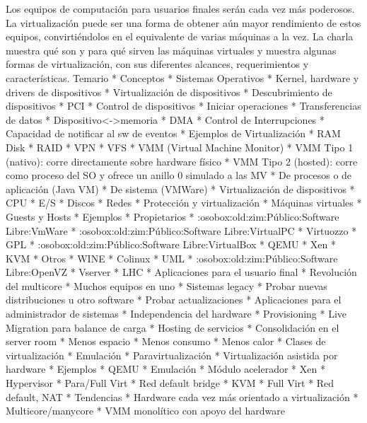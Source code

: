 Los equipos de computación para usuarios finales serán cada vez más
poderosos. La virtualización puede ser una forma de obtener aún mayor
rendimiento de estos equipos, convirtiéndolos en el equivalente de
varias máquinas a la vez. La charla muestra qué son y para qué sirven
las máquinas virtuales y muestra algunas formas de virtualización, con
sus diferentes alcances, requerimientos y características.
Temario
* Conceptos
	* Sistemas Operativos
		* Kernel, hardware y drivers de dispositivos
		* Virtualización de dispositivos
			* Descubrimiento de dispositivos
				* PCI
			* Control de dispositivos
				* Iniciar operaciones
			* Transferencias de datos 
				* Dispositivo<->memoria
				* DMA
			* Control de Interrupciones
				* Capacidad de notificar al sw de eventos
		* Ejemplos de Virtualización
			* RAM Disk
			* RAID
			* VPN
			* VFS
	* VMM (Virtual Machine Monitor)
		* VMM Tipo 1 (nativo): corre directamente sobre hardware físico 
		* VMM Tipo 2 (hosted): corre como proceso del SO y ofrece un anillo 0 simulado a las MV
		* De procesos o de aplicación (Java VM)
		* De sistema (VMWare)
	* Virtualización de dispositivos
		* CPU
		* E/S
		* Discos
		* Redes
	* Protección y virtualización
	* Máquinas virtuales
		* Guests y Hosts
	* Ejemplos
		* Propietarios
			* :osobox:old:zim:Público:Software Libre:VmWare
			* :osobox:old:zim:Público:Software Libre:VirtualPC
			* Virtuozzo
		* GPL
			* :osobox:old:zim:Público:Software Libre:VirtualBox
			* QEMU
			* Xen
			* KVM
		* Otros
			* WINE
			* Colinux
			* UML
			* :osobox:old:zim:Público:Software Libre:OpenVZ
			* Vserver
			* LHC
* Aplicaciones para el usuario final
	* Revolución del multicore
		* Muchos equipos en uno
	* Sistemas legacy
	* Probar nuevas distribuciones u otro software
	* Probar actualizaciones
* Aplicaciones para el administrador de sistemas
	* Independencia del hardware
	* Provisioning
	* Live Migration para balance de carga
	* Hosting de servicios
	* Consolidación en el server room
		* Menos espacio
		* Menos consumo
		* Menos calor
* Clases de virtualización
	* Emulación 
	* Paravirtualización
	* Virtualización asistida por hardware
* Ejemplos
	* QEMU
		* Emulación
		* Módulo acelerador
	* Xen
		* Hypervisor
		* Para/Full Virt
		* Red default bridge
	* KVM
		* Full Virt
		* Red default, NAT
* Tendencias
	* Hardware cada vez más orientado a virtualización
	* Multicore/manycore
	* VMM monolítico con apoyo del hardware
